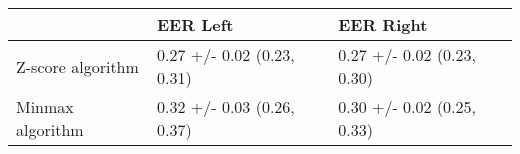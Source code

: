 \begin{tabular}{lll}
\toprule
{} &                    EER Left &                   EER Right \\
\midrule
Z-score algorithm &  0.27 +/- 0.02 (0.23, 0.31) &  0.27 +/- 0.02 (0.23, 0.30) \\
Minmax algorithm  &  0.32 +/- 0.03 (0.26, 0.37) &  0.30 +/- 0.02 (0.25, 0.33) \\
\bottomrule
\end{tabular}
